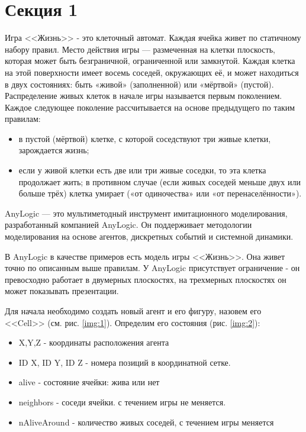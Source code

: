 \section{Секция 1}

Игра <<Жизнь>> - это клеточный автомат. Каждая ячейка живет по статичному набору правил.
Место действия игры — размеченная на клетки плоскость, которая может быть безграничной, ограниченной или замкнутой. 
Каждая клетка на этой поверхности имеет восемь соседей, окружающих её, и может находиться в двух состояниях: быть «живой» (заполненной) или «мёртвой» (пустой).
Распределение живых клеток в начале игры называется первым поколением. Каждое следующее поколение рассчитывается на основе предыдущего по таким правилам:
\begin{itemize}
    \item в пустой (мёртвой) клетке, с которой соседствуют три живые клетки, зарождается жизнь;
    \item если у живой клетки есть две или три живые соседки, то эта клетка продолжает жить; в противном случае (если живых соседей меньше двух или больше трёх) клетка умирает («от одиночества» или «от перенаселённости»).
\end{itemize}

AnyLogic — это мультиметодный инструмент имитационного моделирования, разработанный компанией AnyLogic\cite{AnyLogic}.
Он поддерживает методологии моделирования на основе агентов, дискретных событий и системной динамики\cite{7822080}.

В AnyLogic в качестве примеров есть модель игры <<Жизнь>>. Она живет точно по описанным выше правилам.
У AnyLogic присутствует ограничение - он превосходно работает в двумерных плоскостях, на трехмерных плоскостях он может показывать презентации.

Для начала необходимо создать новый агент и его фигуру, назовем его <<Cell>> (см. рис. \ref{img:1}). Определим его состояния (рис. \ref{img:2}):
\begin{itemize}
    \item X,Y,Z - координаты расположения агента
    \item ID X, ID Y, ID Z - номера позиций в координатной сетке.
    \item alive - состояние ячейки: жива или нет
    \item neighbors - соседи ячейки. с течением игры не меняется.
    \item nAliveAround - количество живых соседей, с течением игры меняется
\end{itemize}

